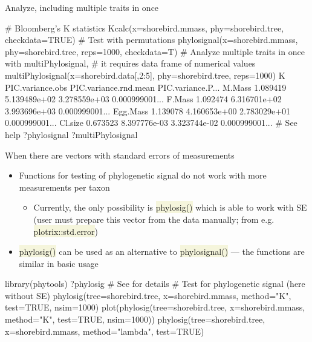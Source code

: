 \documentclass[compress, xelatex, 11pt, xcolor=svgnames, aspectratio=169,
	hyperref={
		bookmarks=true,
		unicode=true,
		colorlinks=true,
		pdftitle={Molecular data in R},
		plainpages=false,
		pdfauthor={Vojtech Zeisek},
		pdfsubject={Course about phylogeny and evolution in R},
		pdfcreator={XeLaTeX},
		pdfkeywords={R, evolution, phylogeny, molecular data},
		linkcolor=Crimson, %
		anchorcolor=Magenta, %
		citecolor=Magenta, %
		filecolor=Magenta, %
		menucolor=Magenta, %
		urlcolor=DodgerBlue, %
		},
	url={hyphens, lowtilde} %
	]{beamer}
\renewcommand{\texttt}[1]{\colorbox{Beige}{{\ttfamily #1}}}
\begin{document}
\begin{frame}[fragile]{Analyze, including multiple traits in once}
	\begin{spluscode}
    # Bloomberg's K statistics
    Kcalc(x=shorebird.mmass, phy=shorebird.tree, checkdata=TRUE)
    # Test with permutations
    phylosignal(x=shorebird.mmass, phy=shorebird.tree, reps=1000, checkdata=T)
    # Analyze multiple traits in once with multiPhylosignal,
    # it requires data frame of numerical values
    multiPhylosignal(x=shorebird.data[,2:5], phy=shorebird.tree, reps=1000)
                    K PIC.variance.obs PIC.variance.rnd.mean PIC.variance.P...
    M.Mass   1.089419     5.139489e+02          3.278559e+03    0.000999001...
    F.Mass   1.092474     6.316701e+02          3.993696e+03    0.000999001...
    Egg.Mass 1.139078     4.160653e+00          2.783029e+01    0.000999001...
    Cl.size  0.673523     8.397776e-03          3.323744e-02    0.000999001...
    # See help
    ?phylosignal
    ?multiPhylosignal
	\end{spluscode}
\end{frame}

\begin{frame}[fragile]{When there are vectors with standard errors of measurements}
	\begin{itemize}
		\item Functions for testing of phylogenetic signal do not work with more measurements per taxon
		\begin{itemize}
			\item Currently, the only possibility is \texttt{phylosig()} which is able to work with SE (user must prepare this vector from the data manually; from e.g. \texttt{plotrix::std.error})
		\end{itemize}
		\item \texttt{phylosig()} can be used as an alternative to \texttt{phylosignal()} --- the functions are similar in basic usage
	\end{itemize}
	\begin{spluscode}
    library(phytools)
    ?phylosig # See for details
    # Test for phylogenetic signal (here without SE)
    phylosig(tree=shorebird.tree, x=shorebird.mmass, method="K", test=TRUE,
      nsim=1000)
    plot(phylosig(tree=shorebird.tree, x=shorebird.mmass, method="K",
      test=TRUE, nsim=1000))
    phylosig(tree=shorebird.tree, x=shorebird.mmass, method="lambda",
      test=TRUE)
	\end{spluscode}
\end{frame}
\end{document}
